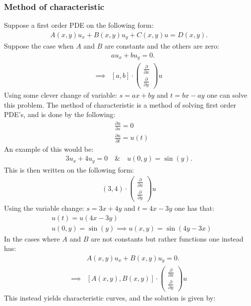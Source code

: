 \documentclass[12pt]{article}
\begin{document}
\subsubsection{Method of characteristic}
Suppose a first order PDE on the following form:
\begin{align*}
    A(x,y)u_x + B(x,y)u_y + C(x,y)u = D(x,y).
\end{align*}Suppose the case when $A$ and $B$ are constants and the others are zero:
\begin{align*}
    &au_x+ bu_y = 0.\\
    \implies & [a,b]\cdot\begin{pmatrix}
        \frac{\partial}{\partial x}\\
        \frac{\partial }{\partial y}
    \end{pmatrix}u
\end{align*}Using some clever change of variable: $s = ax + by$ and $t = bx - ay$ one can solve this problem. The method of characteristic is a method of solving first order PDE's, and is done by the following:
\begin{align*}
    &\frac{\partial u}{\partial s} = 0\\
    &\frac{\partial u}{\partial t} = u(t)
\end{align*}An example of this would be:
\begin{align*}
    3u_x + 4u_y = 0\quad \&\quad u(0,y) = \sin(y).
\end{align*}This is then written on the following form:
\begin{align*}
    (3,4)\cdot\begin{pmatrix}
        \frac{\partial}{\partial x}\\
        \frac{\partial }{\partial y}
    \end{pmatrix}u
\end{align*}Using the variable change: $s = 3x + 4y$ and $t = 4x - 3y$ one has that:
\begin{align*}
    &u(t) = u(4x - 3y)\\
    &u(0,y) = \sin(y)\implies u(x,y) = \sin\left(4y -3x\right)
\end{align*}In the cases where $A$ and $B$ are not constants but rather functions one instead has:
\begin{align*}
        &A(x,y)u_x+ B(x,y)u_y = 0.\\
    \implies & [A(x,y),B(x,y)]\cdot\begin{pmatrix}
        \frac{\partial}{\partial x}\\
        \frac{\partial }{\partial y}
    \end{pmatrix}u
\end{align*}This instead yields characteristic curves, and the solution is given by:
\end{document}
